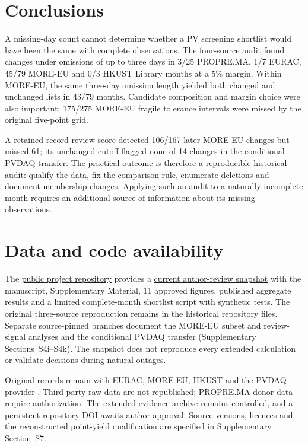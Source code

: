 \documentclass[preprint,12pt]{elsarticle}
\begin{document}
\section{Conclusions}
A missing-day count cannot determine whether a PV screening shortlist would have been the same with complete observations. The four-source audit found changes under omissions of up to three days in 3/25 PROPRE.MA, 1/7 EURAC, 45/79 MORE-EU and 0/3 HKUST Library months at a 5\% margin. Within MORE-EU, the same three-day omission length yielded both changed and unchanged lists in 43/79 months. Candidate composition and margin choice were also important: 175/275 MORE-EU fragile tolerance intervals were missed by the original five-point grid.

A retained-record review score detected 106/167 later MORE-EU changes but missed 61; its unchanged cutoff flagged none of 14 changes in the conditional PVDAQ transfer. The practical outcome is therefore a reproducible historical audit: qualify the data, fix the comparison rule, enumerate deletions and document membership changes. Applying such an audit to a naturally incomplete month requires an additional source of information about its missing observations.

\section*{Data and code availability}
The \href{https://github.com/shaikhamalkawi-ux/pv-missing-day-decision-reliability}{public project repository} provides a \href{https://github.com/shaikhamalkawi-ux/pv-missing-day-decision-reliability/tree/main/release/2026-11-22-r55-ep2}{current author-review snapshot} with the manuscript, Supplementary Material, 11 approved figures, published aggregate results and a limited complete-month shortlist script with synthetic tests. The original three-source reproduction remains in the historical repository files. Separate source-pinned branches document the MORE-EU subset and review-signal analyses and the conditional PVDAQ transfer (Supplementary Sections~S4i--S4k). The snapshot does not reproduce every extended calculation or validate decisions during natural outages.

Original records remain with \href{https://doi.org/10.5281/zenodo.18316996}{EURAC}, \href{https://github.com/MORE-EU/OpenData}{MORE-EU}, \href{https://zenodo.org/records/10909062}{HKUST} and the PVDAQ provider \cite{deline2021}. Third-party raw data are not republished; PROPRE.MA donor data require authorization. The extended evidence archive remains controlled, and a persistent repository DOI awaits author approval. Source versions, licences and the reconstructed point-yield qualification are specified in Supplementary Section~S7.
\end{document}
